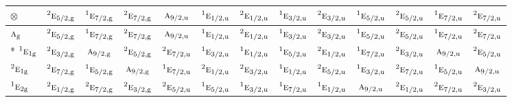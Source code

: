 \documentclass[10pt,a4paper]{article}
\numberwithin{equation}{section}
\newcommand{\irr}[1]{\text{\normalfont\scshape #1}}
\newcommand{\conjpair}[1]{{}^{#1}}
\newcommand{\ptag}[1]{\mathrm{#1}}
\newcommand{\irrprod}{\otimes}
\begin{document}
{\small\setlength{\tabcolsep}{3pt}\begin{longtable}{@{}lcccccccccccc@{}}\toprule
$\irrprod$ & $\conjpair{2}\irr{e}_{5/2,\ptag{g}}$ & $\conjpair{1}\irr{e}_{7/2,\ptag{g}}$ & $\conjpair{2}\irr{e}_{7/2,\ptag{g}}$ & $\irr{a}_{9/2,\ptag{u}}$ & $\conjpair{1}\irr{e}_{1/2,\ptag{u}}$ & $\conjpair{2}\irr{e}_{1/2,\ptag{u}}$ & $\conjpair{1}\irr{e}_{3/2,\ptag{u}}$ & $\conjpair{2}\irr{e}_{3/2,\ptag{u}}$ & $\conjpair{1}\irr{e}_{5/2,\ptag{u}}$ & $\conjpair{2}\irr{e}_{5/2,\ptag{u}}$ & $\conjpair{1}\irr{e}_{7/2,\ptag{u}}$ & $\conjpair{2}\irr{e}_{7/2,\ptag{u}}$\\\midrule\endhead
\bottomrule\endfoot\endlastfoot
$\irr{a}_{\ptag{g}}$ & $\conjpair{2}\irr{e}_{5/2,\ptag{g}}$ & $\conjpair{1}\irr{e}_{7/2,\ptag{g}}$ & $\conjpair{2}\irr{e}_{7/2,\ptag{g}}$ & $\irr{a}_{9/2,\ptag{u}}$ & $\conjpair{1}\irr{e}_{1/2,\ptag{u}}$ & $\conjpair{2}\irr{e}_{1/2,\ptag{u}}$ & $\conjpair{1}\irr{e}_{3/2,\ptag{u}}$ & $\conjpair{2}\irr{e}_{3/2,\ptag{u}}$ & $\conjpair{1}\irr{e}_{5/2,\ptag{u}}$ & $\conjpair{2}\irr{e}_{5/2,\ptag{u}}$ & $\conjpair{1}\irr{e}_{7/2,\ptag{u}}$ & $\conjpair{2}\irr{e}_{7/2,\ptag{u}}$\\*
$\conjpair{1}\irr{e}_{1\ptag{g}}$ & $\conjpair{2}\irr{e}_{3/2,\ptag{g}}$ & $\irr{a}_{9/2,\ptag{g}}$ & $\conjpair{2}\irr{e}_{5/2,\ptag{g}}$ & $\conjpair{2}\irr{e}_{7/2,\ptag{u}}$ & $\conjpair{1}\irr{e}_{3/2,\ptag{u}}$ & $\conjpair{1}\irr{e}_{1/2,\ptag{u}}$ & $\conjpair{1}\irr{e}_{5/2,\ptag{u}}$ & $\conjpair{2}\irr{e}_{1/2,\ptag{u}}$ & $\conjpair{1}\irr{e}_{7/2,\ptag{u}}$ & $\conjpair{2}\irr{e}_{3/2,\ptag{u}}$ & $\irr{a}_{9/2,\ptag{u}}$ & $\conjpair{2}\irr{e}_{5/2,\ptag{u}}$\\
$\conjpair{2}\irr{e}_{1\ptag{g}}$ & $\conjpair{2}\irr{e}_{7/2,\ptag{g}}$ & $\conjpair{1}\irr{e}_{5/2,\ptag{g}}$ & $\irr{a}_{9/2,\ptag{g}}$ & $\conjpair{1}\irr{e}_{7/2,\ptag{u}}$ & $\conjpair{2}\irr{e}_{1/2,\ptag{u}}$ & $\conjpair{2}\irr{e}_{3/2,\ptag{u}}$ & $\conjpair{1}\irr{e}_{1/2,\ptag{u}}$ & $\conjpair{2}\irr{e}_{5/2,\ptag{u}}$ & $\conjpair{1}\irr{e}_{3/2,\ptag{u}}$ & $\conjpair{2}\irr{e}_{7/2,\ptag{u}}$ & $\conjpair{1}\irr{e}_{5/2,\ptag{u}}$ & $\irr{a}_{9/2,\ptag{u}}$\\
$\conjpair{1}\irr{e}_{2\ptag{g}}$ & $\conjpair{2}\irr{e}_{1/2,\ptag{g}}$ & $\conjpair{2}\irr{e}_{7/2,\ptag{g}}$ & $\conjpair{2}\irr{e}_{3/2,\ptag{g}}$ & $\conjpair{2}\irr{e}_{5/2,\ptag{u}}$ & $\conjpair{1}\irr{e}_{5/2,\ptag{u}}$ & $\conjpair{1}\irr{e}_{3/2,\ptag{u}}$ & $\conjpair{1}\irr{e}_{7/2,\ptag{u}}$ & $\conjpair{1}\irr{e}_{1/2,\ptag{u}}$ & $\irr{a}_{9/2,\ptag{u}}$ & $\conjpair{2}\irr{e}_{1/2,\ptag{u}}$ & $\conjpair{2}\irr{e}_{7/2,\ptag{u}}$ & $\conjpair{2}\irr{e}_{3/2,\ptag{u}}$\\

\end{longtable}}
\end{document}
